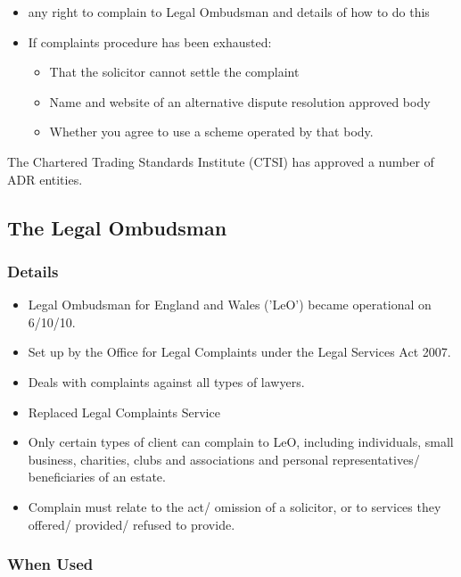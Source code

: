 \documentclass[
]{article}
\providecommand{\tightlist}{%
  \setlength{\itemsep}{0pt}\setlength{\parskip}{0pt}}
\begin{document}
\begin{itemize}
\tightlist
\item
  any right to complain to Legal Ombudsman and details of how to do this
\item
  If complaints procedure has been exhausted:

  \begin{itemize}
  \tightlist
  \item
    That the solicitor cannot settle the complaint
  \item
    Name and website of an alternative dispute resolution approved body
  \item
    Whether you agree to use a scheme operated by that body.
  \end{itemize}
\end{itemize}

The Chartered Trading Standards Institute (CTSI) has approved a number
of ADR entities.

\hypertarget{the-legal-ombudsman}{%
\subsection{The Legal Ombudsman}\label{the-legal-ombudsman}}

\hypertarget{details}{%
\subsubsection{Details}\label{details}}

\begin{itemize}
\tightlist
\item
  Legal Ombudsman for England and Wales ('LeO') became operational on
  6/10/10.
\item
  Set up by the Office for Legal Complaints under the Legal Services Act
  2007.
\item
  Deals with complaints against all types of lawyers.
\item
  Replaced Legal Complaints Service
\item
  Only certain types of client can complain to LeO, including
  individuals, small business, charities, clubs and associations and
  personal representatives/ beneficiaries of an estate.
\item
  Complain must relate to the act/ omission of a solicitor, or to
  services they offered/ provided/ refused to provide.
\end{itemize}

\hypertarget{when-used}{%
\subsubsection{When Used}\label{when-used}}
\end{document}
